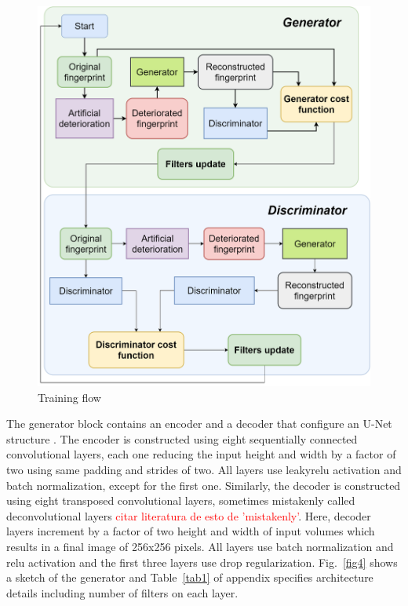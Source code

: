 \documentclass[a4paper,fleqn]{cas-dc}
\begin{document}
\begin{figure}[!ht]
\centerline{\includegraphics[scale=0.4]{figs/training_fd_en_v.png}}
\caption{Training flow}
\label{fig:diagramGenDis}
\end{figure}
The generator block contains an encoder and a decoder that configure an U-Net structure \cite{UNBIS}. The encoder is constructed using eight sequentially connected convolutional layers, each one reducing the input height and width by a factor of two using same padding and strides of two. All layers use leakyrelu activation and batch normalization, except for the first one. Similarly, the decoder is constructed using eight transposed convolutional layers, sometimes mistakenly called deconvolutional layers \textcolor{green}{\cite{dumoulin2016guide}} \textcolor{red}{citar literatura de esto de 'mistakenly'}. Here, decoder layers increment by a factor of two height and width of input volumes which results in a final image of 256x256 pixels. All layers use batch normalization and relu activation and the first three layers use drop regularization. Fig.~\ref{fig4} shows a sketch of the generator and Table~\ref{tab1} of appendix specifies architecture details including number of filters on each layer.
\end{document}

